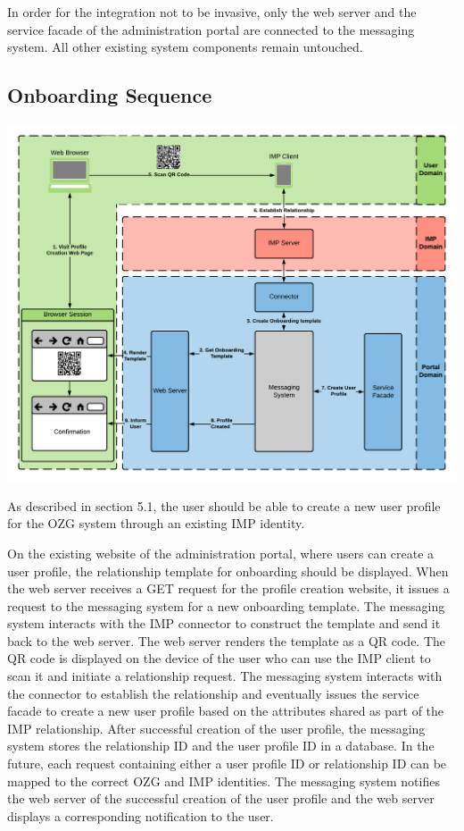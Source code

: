In order for the integration not to be invasive, only the web server and the service facade of the administration portal are connected to the messaging system. All other existing system components remain untouched.

\subsection{Onboarding Sequence}

\begin{center}
    \includegraphics[scale=0.6]{Diagrams/Integration Architecture 1/Technological Integration/5. Onboarding Overview.pdf}
\end{center}

As described in section 5.1, the user should be able to create a new user profile for the OZG system through an existing IMP identity.

On the existing website of the administration portal, where users can create a user profile, the relationship template for onboarding should be displayed. When the web server receives a GET request for the profile creation website, it issues a request to the messaging system for a new onboarding template. The messaging system interacts with the IMP connector to construct the template and send it back to the web server. The web server renders the template as a QR code. The QR code is displayed on the device of the user who can use the IMP client to scan it and initiate a relationship request. The messaging system interacts with the connector to establish the relationship and eventually issues the service facade to create a new user profile based on the attributes shared as part of the IMP relationship. After successful creation of the user profile, the messaging system stores the relationship ID and the user profile ID in a database. In the future, each request containing either a user profile ID or relationship ID can be mapped to the correct OZG and IMP identities. The messaging system notifies the web server of the successful creation of the user profile and the web server displays a corresponding notification to the user.

